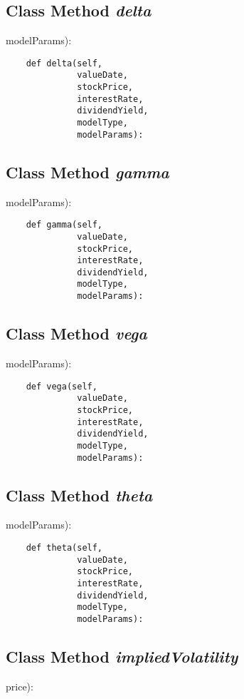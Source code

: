 \documentclass[twoside,11pt]{book}
\begin{document}
\subsection{Class Method {\it delta}}
modelParams):

\begin{lstlisting}
    def delta(self,
              valueDate,
              stockPrice,
              interestRate,
              dividendYield,
              modelType,
              modelParams):
\end{lstlisting}

\subsection{Class Method {\it gamma}}
modelParams):

\begin{lstlisting}
    def gamma(self,
              valueDate,
              stockPrice,
              interestRate,
              dividendYield,
              modelType,
              modelParams):
\end{lstlisting}

\subsection{Class Method {\it vega}}
modelParams):

\begin{lstlisting}
    def vega(self,
              valueDate,
              stockPrice,
              interestRate,
              dividendYield,
              modelType,
              modelParams):
\end{lstlisting}

\subsection{Class Method {\it theta}}
modelParams):

\begin{lstlisting}
    def theta(self,
              valueDate,
              stockPrice,
              interestRate,
              dividendYield,
              modelType,
              modelParams):
\end{lstlisting}

\subsection{Class Method {\it impliedVolatility}}
price):
\end{document}
